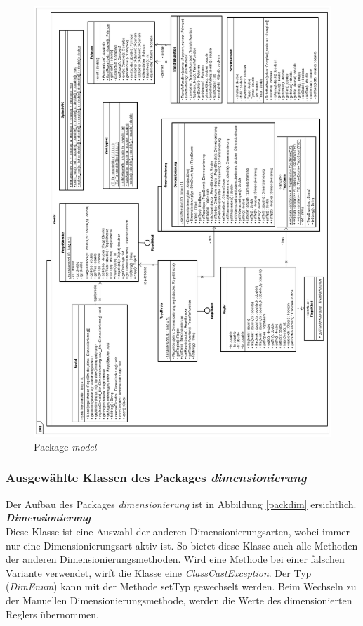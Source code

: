 \begin{figure}[p]
\centering
\includegraphics[width=1\textwidth]{packmodel.png}
\caption{Package \textit{model}}
\label{packmodel}
\end{figure}

\newpage
\subsubsection{Ausgewählte Klassen des Packages \textit{dimensionierung}}
Der Aufbau des Packages \textit{dimensionierung} ist in Abbildung \ref{packdim} ersichtlich.\\

\textit{\textbf{Dimensionierung}}\\
Diese Klasse ist eine Auswahl der anderen Dimensionierungsarten, wobei immer nur eine Dimensionierungsart aktiv ist. So bietet diese Klasse auch alle Methoden der anderen Dimensionierungsmethoden. Wird eine Methode bei einer falschen Variante verwendet, wirft die Klasse eine \textit{ClassCastException}. Der Typ (\textit{DimEnum}) kann mit der Methode setTyp gewechselt werden. Beim Wechseln zu der Manuellen Dimensionierungsmethode, werden die Werte des dimensionierten Reglers übernommen.\\

